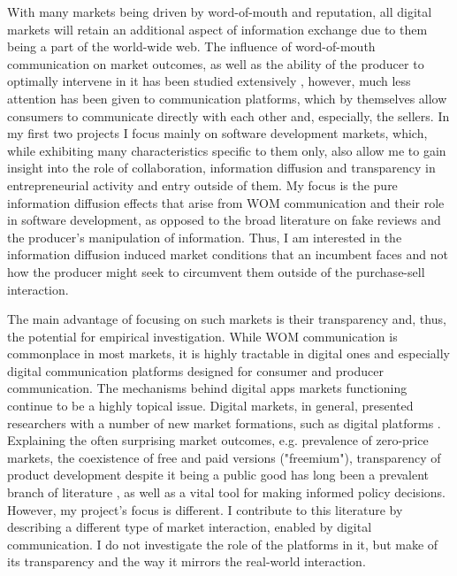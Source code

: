 \documentclass[13pt]{article}
\numberwithin{figure}{section}
\numberwithin{table}{section}
\theoremstyle{indented}
\numberwithin{equation}{section} %
\begin{document}
With many markets being driven by word-of-mouth and reputation, all digital markets will retain an additional aspect of information exchange due to them being a part of the world-wide web. The influence of word-of-mouth communication on market outcomes, as well as the ability of the producer to optimally intervene in it has been studied extensively \citep{Mayzlin2006, Godes2009}, however, much less attention has been given to communication platforms, which by themselves allow consumers to communicate directly with each other \citep{Godes2004} and, especially, the sellers. In my first two projects I focus mainly on software development markets, which, while exhibiting many characteristics specific to them only, also allow me to gain insight into the role of collaboration, information diffusion and transparency in entrepreneurial activity and entry outside of them. My focus is the pure information diffusion effects  that arise from WOM communication and their role in software development, as opposed to the broad literature on fake reviews and the producer's manipulation of information. Thus, I am interested in the information diffusion induced market conditions that an incumbent faces and not how the producer might seek to circumvent them outside of the purchase-sell interaction. 

The main advantage of focusing on such markets is their transparency and, thus, the potential for empirical investigation. While WOM communication is commonplace in most markets, it is highly tractable in digital ones and especially digital communication platforms designed for consumer and producer communication. The mechanisms behind digital apps markets functioning continue to be a highly topical issue. Digital markets, in general, presented researchers with a number of new market formations, such as digital platforms \citep{Just2018, Choi2021, Appel2020}. Explaining the often surprising market outcomes, e.g. prevalence of zero-price markets, the coexistence of free and paid versions ("freemium"), transparency of product development despite it being a public good has long been a prevalent branch of literature \citep{Appel2020, Ajorlou2018}, as well as a vital tool for making informed policy decisions. However, my project's focus is different. I contribute to this literature by describing a different type of market interaction, enabled by digital communication. I do not investigate the role of the platforms in it, but make of its transparency and the way it mirrors the real-world interaction.
\end{document}
